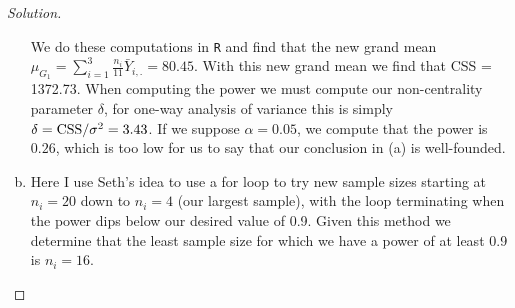 \documentclass{amsart}\usepackage[]{graphicx}\usepackage[]{color}
\begin{document}
\begin{proof}[Solution]
\begin{enumerate}[(a)]
			We do these computations in \verb|R| and find that the new grand mean $\mu_{G_{1}} = \sum_{i=1}^{3} \frac{n_{i}}{11} \bar{Y}_{i,.} = 80.45$.
			With this new grand mean we find that CSS = 1372.73.
			When computing the power we must compute our non-centrality parameter $\delta$, for one-way analysis of variance this is simply $\delta = \rm CSS/\sigma^{2} = 3.43$.
			If we suppose $\alpha = 0.05$, we compute that the power is $0.26$, which is too low for us to say that our conclusion in (a) is well-founded.
			\item Here I use Seth's idea to use a for loop to try new sample sizes starting at $n_{i} = 20$ down to $n_{i} = 4$ (our largest sample), with the loop terminating when the power dips below our desired value of 0.9.
			Given this method we determine that the least sample size for which we have a power of at least 0.9 is $n_{i} = 16$.
		\end{enumerate}
		\end{proof}
\end{document}
